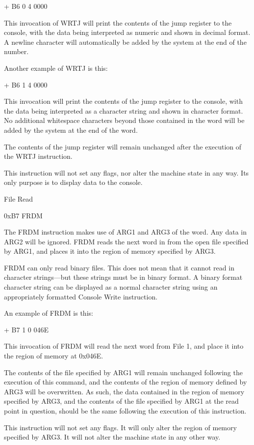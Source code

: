 \documentclass[]{article}
\begin{document}
+ B6 0 4 0000

This invocation of WRTJ will print the contents of the jump register to
the console, with the data being interpreted as numeric and shown in
decimal format. A newline character will automatically be added by the
system at the end of the number.

Another example of WRTJ is this:

+ B6 1 4 0000

This invocation will print the contents of the jump register to the
console, with the data being interpreted as a character string and shown
in character format. No additional whitespace characters beyond those
contained in the word will be added by the system at the end of the
word.

The contents of the jump register will remain unchanged after the
execution of the WRTJ instruction.

This instruction will not set any flags, nor alter the machine state in
any way. Its only purpose is to display data to the console.

File Read

0xB7 FRDM

The FRDM instruction makes use of ARG1 and ARG3 of the word. Any data in
ARG2 will be ignored. FRDM reads the next word in from the open file
specified by ARG1, and places it into the region of memory specified by
ARG3.

FRDM can only read binary files. This does not mean that it cannot read
in character strings---but these strings must be in binary format. A
binary format character string can be displayed as a normal character
string using an appropriately formatted Console Write instruction.

An example of FRDM is this:

+ B7 1 0 046E

This invocation of FRDM will read the next word from File 1, and place
it into the region of memory at 0x046E.

The contents of the file specified by ARG1 will remain unchanged
following the execution of this command, and the contents of the region
of memory defined by ARG3 will be overwritten. As such, the data
contained in the region of memory specified by ARG3, and the contents of
the file specified by ARG1 at the read point in question, should be the
same following the execution of this instruction.

This instruction will not set any flags. It will only alter the region
of memory specified by ARG3. It will not alter the machine state in any
other way.
\end{document}
